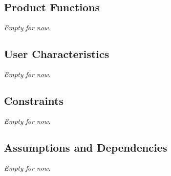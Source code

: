 	\subsection{Product Functions}
	\textit{Empty for now.}
	
	\subsection{User Characteristics}
	\textit{Empty for now.}
	
	\subsection{Constraints}
	\textit{Empty for now.}
	
	\subsection{Assumptions and Dependencies}
	\textit{Empty for now.}